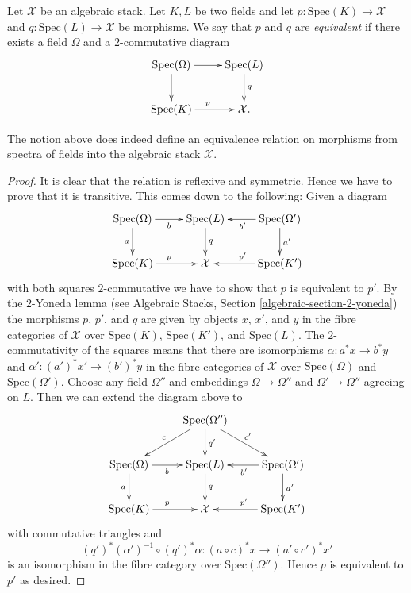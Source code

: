 \noindent
Let $\mathcal{X}$ be an algebraic stack. Let $K, L$ be two fields
and let $p : \text{Spec}(K) \to \mathcal{X}$ and
$q : \text{Spec}(L) \to \mathcal{X}$ be morphisms.
We say that $p$ and $q$ are {\it equivalent} if there exists a
field $\Omega$ and a $2$-commutative diagram
$$
\xymatrix{
\text{Spec}(\Omega) \ar[r] \ar[d] &
\text{Spec}(L) \ar[d]^q \\
\text{Spec}(K) \ar[r]^p &
\mathcal{X}.
}
$$

\begin{lemma}
\label{lemma-equivalence}
The notion above does indeed define an equivalence relation on
morphisms from spectra of fields into the algebraic stack $\mathcal{X}$.
\end{lemma}

\begin{proof}
It is clear that the relation is reflexive and symmetric.
Hence we have to prove that it is transitive. This comes down
to the following: Given a diagram
$$
\xymatrix{
\text{Spec}(\Omega) \ar[r]_b \ar[d]_a &
\text{Spec}(L) \ar[d]^q & \text{Spec}(\Omega') \ar[l]^{b'} \ar[d]^{a'} \\
\text{Spec}(K) \ar[r]^p &
\mathcal{X} &
\text{Spec}(K') \ar[l]_{p'}
}
$$
with both squares $2$-commutative we have to show that $p$ is equivalent to
$p'$. By the $2$-Yoneda lemma (see
Algebraic Stacks, Section \ref{algebraic-section-2-yoneda})
the morphisms $p$, $p'$, and $q$ are given by objects
$x$, $x'$, and $y$ in the fibre categories of $\mathcal{X}$ over
$\text{Spec}(K)$, $\text{Spec}(K')$, and $\text{Spec}(L)$. The
$2$-commutativity of the squares means that there are isomorphisms
$\alpha : a^*x \to b^*y$ and $\alpha' : (a')^*x' \to (b')^*y$
in the fibre categories
of $\mathcal{X}$ over $\text{Spec}(\Omega)$ and $\text{Spec}(\Omega')$.
Choose any field $\Omega''$ and embeddings
$\Omega \to \Omega''$ and $\Omega' \to \Omega''$ agreeing on $L$.
Then we can extend the diagram above to
$$
\xymatrix{
& \text{Spec}(\Omega'') \ar[ld]_c \ar[d]^{q'} \ar[rd]^{c'} \\
\text{Spec}(\Omega) \ar[r]_b \ar[d]_a &
\text{Spec}(L) \ar[d]^q & \text{Spec}(\Omega') \ar[l]^{b'} \ar[d]^{a'} \\
\text{Spec}(K) \ar[r]^p &
\mathcal{X} &
\text{Spec}(K') \ar[l]_{p'}
}
$$
with commutative triangles and
$$
(q')^*(\alpha')^{-1} \circ (q')^*\alpha :
(a \circ c)^*x
\longrightarrow
(a' \circ c')^*x'
$$
is an isomorphism in the fibre category over $\text{Spec}(\Omega'')$.
Hence $p$ is equivalent to $p'$ as desired.
\end{proof}

